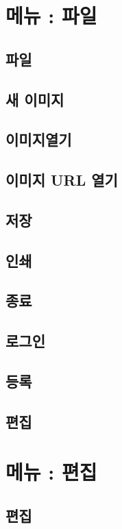 \documentclass[12pt, a4paper, oneside]{book}
\let\stdsection\section
\renewcommand\section{\newpage\stdsection}
\begin{document}
	\chapter{메뉴 : 파일} 
	\minitoc
\section{	파일	}		

\section{	새 이미지		}									
\section{	이미지열기		}									
\section{	이미지 URL 열기		}									
\section{	저장		}									
\section{	인쇄		}									
\section{	종료		}									
\section{	로그인		}									
\section{	등록		}									
\section{	편집		}									


					
	\chapter{메뉴 : 편집} 
	\minitoc
\section{	편집	}										
\end{document}
